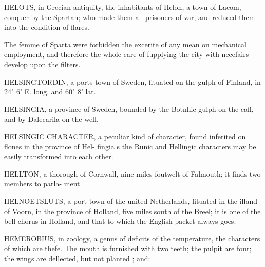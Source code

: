 HELOTS, in Grecian antiquity, the inhabitants of Helon, a town of Lacom, conquer by the Spartan; who made them all prisoners of var, and reduced them into the condition of flares.\par\medskip
The femme of Sparta were forbidden the excerite of any mean on mechanical employment, and therefore the whole care of fupplying the city with necefairs develop upon the filters.\par\medskip
HELSINGTORDIN, a ports town of Sweden, fituated on the gulph of Finland, in 24" 6' E. long. and 60" 8' lat.\par\medskip
HELSINGIA, a province of Sweden, bounded by the Botnhic gulph on the cafl, and by Dalecarila on the well.\par\medskip
HELSINGIC CHARACTER, a peculiar kind of character, found inferited on flones in the province of Hel- fingia s the Runic and Hellingic characters may be easily transformed into each other.\par\medskip
HELLTON, a thorough of Cornwall, nine miles foutwelt of Falmouth; it finds two members to parla- ment.\par\medskip
HELNOETSLUTS, a port-town of the united Netherlands, fituated in the illand of Voorn, in the province of Holland, five miles south of the Breel; it is one of the bell chorus in Holland, and that to which the English packet always goes.\par\medskip
HEMEROBIUS, in zoology, a genus of deficits of the temperature, the characters of which are thefe. The mouth is furnished with two teeth; the pulpit are four; the wings are dellected, but not planted ; and:\par\medskip
